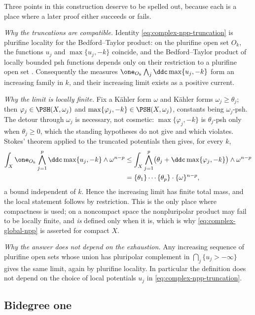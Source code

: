 Three points in this construction deserve to be spelled out, because each
is a place where a later proof either succeeds or fails.

\emph{Why the truncations are compatible.}  Identity
\eqref{eq:complex-npp-truncation} is plurifine locality for the
Bedford--Taylor product: on the plurifine open set \(O_k\), the functions
\(u_j\) and \(\max\{u_j,-k\}\) coincide, and the Bedford--Taylor product
of locally bounded psh functions depends only on their restriction to a
plurifine open set \cite{BT87}.  Consequently the measures
\(\one_{O_k}\bigwedge_j\ddc\max\{u_j,-k\}\) form an increasing family in
\(k\), and their increasing limit exists as a positive current.

\emph{Why the limit is locally finite.}  Fix a K\"ahler form \(\omega\) and
K\"ahler forms \(\omega_j\geq\theta_j\); then \(\varphi_j\in\PSH(X,\omega_j)\)
and \(\max\{\varphi_j,-k\}\in\PSH(X,\omega_j)\), constants being
\(\omega_j\)-psh.  The detour through \(\omega_j\) is necessary, not
cosmetic: \(\max\{\varphi_j,-k\}\) is \(\theta_j\)-psh only when
\(\theta_j\geq0\), which the standing hypotheses do not give and which
 violates.  Stokes' theorem applied to the
truncated potentials then gives, for every \(k\),
\[
 \begin{aligned}
 \int_X\one_{O_k}\bigwedge_{j=1}^p\ddc\max\{u_j,-k\}\wedge\omega^{n-p}
 &\leq
 \int_X\bigwedge_{j=1}^p
     \bigl(\theta_j+\ddc\max\{\varphi_j,-k\}\bigr)\wedge\omega^{n-p}\\
 &=\{\theta_1\}\cdots\{\theta_p\}\cdot\{\omega\}^{n-p},
 \end{aligned}
\]
a bound independent of \(k\).  Hence the increasing limit has finite
total mass, and the local statement follows by restriction.  This is the
only place where compactness is used; on a noncompact space the
nonpluripolar product may fail to be locally finite, and \emph{is} defined
only when it is, which is why \eqref{eq:complex-global-npp} is asserted
for compact \(X\).

\emph{Why the answer does not depend on the exhaustion.}  Any increasing
sequence of plurifine open sets whose union has pluripolar complement in
\(\bigcap_j\{u_j>-\infty\}\) gives the same limit, again by plurifine
locality.  In particular the definition does not depend on the choice of
local potentials \(u_j\) in \eqref{eq:complex-npp-truncation}.

\subsection{Bidegree one}
\label{sec:ch51-npp-bidegree-one}

